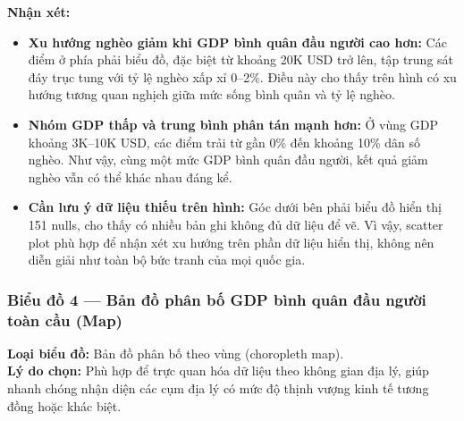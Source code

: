 
\textbf{Nhận xét:}
\begin{itemize}
    \item \textbf{Xu hướng nghèo giảm khi GDP bình quân đầu người cao hơn:} Các điểm ở phía phải biểu đồ, đặc biệt từ khoảng 20K USD trở lên, tập trung sát đáy trục tung với tỷ lệ nghèo xấp xỉ 0--2\%. Điều này cho thấy trên hình có xu hướng tương quan nghịch giữa mức sống bình quân và tỷ lệ nghèo.
    \item \textbf{Nhóm GDP thấp và trung bình phân tán mạnh hơn:} Ở vùng GDP khoảng 3K--10K USD, các điểm trải từ gần 0\% đến khoảng 10\% dân số nghèo. Như vậy, cùng một mức GDP bình quân đầu người, kết quả giảm nghèo vẫn có thể khác nhau đáng kể.
    \item \textbf{Cần lưu ý dữ liệu thiếu trên hình:} Góc dưới bên phải biểu đồ hiển thị 151 nulls, cho thấy có nhiều bản ghi không đủ dữ liệu để vẽ. Vì vậy, scatter plot phù hợp để nhận xét xu hướng trên phần dữ liệu hiển thị, không nên diễn giải như toàn bộ bức tranh của mọi quốc gia.
\end{itemize}

\subsubsection{Biểu đồ 4 --- Bản đồ phân bố GDP bình quân đầu người toàn cầu (Map)}

\textbf{Loại biểu đồ:} Bản đồ phân bố theo vùng (choropleth map).\\
\textbf{Lý do chọn:} Phù hợp để trực quan hóa dữ liệu theo không gian địa lý, giúp nhanh chóng nhận diện các cụm địa lý có mức độ thịnh vượng kinh tế tương đồng hoặc khác biệt.


